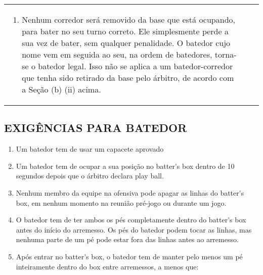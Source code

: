 {\begin{tabular}{p{}p{}|p{}}
\begin{enumerate}[label=\alph*)]
\begin{enumerate}[label=\roman*.]
			\end{enumerate}
			\item  Nenhum corredor ser\'a removido da base que est\'a ocupando, para bater no seu turno correto. Ele simplesmente perde a sua vez de bater, sem qualquer penalidade. O batedor cujo nome vem em seguida ao seu, na ordem de batedores, torna-se o batedor legal. Isso n\~ao se aplica a um batedor-corredor que tenha sido retirado da base pelo \'arbitro, de acordo com a Se\c{c}\~ao (b) (ii) acima. 
		\end{enumerate}
\end{tabular}}

\begin{multicols}{2}
	\subsection{EXIGÊNCIAS PARA BATEDOR }
	
	\begin{enumerate}[label=\alph*)]
		\item Um batedor tem de usar um capacete aprovado
		\item Um batedor tem de ocupar a sua posi\c{c}\~ao no \gls{batter's box} dentro de 10 segundos depois que o \'arbitro declara \gls{play ball}. 
		
		\item  Nenhum membro da equipe na ofensiva pode apagar as linhas do \gls{batter's box}, em nenhum momento na reuni\~ao pr\'e-jogo ou durante um jogo. 
		
		\item  O batedor tem de ter ambos os p\'es completamente dentro do \gls{batter's box} antes do in\'icio do arremesso. Os p\'es do batedor podem tocar as linhas, mas nenhuma parte de um p\'e pode estar fora das linhas antes ao arremesso. 
		
		\item  Ap\'os entrar no \gls{batter's box}, o batedor tem de manter pelo menos um p\'e inteiramente dentro do \gls{box} entre arremessos, a menos que: 
		

\end{enumerate}
\end{multicols}
